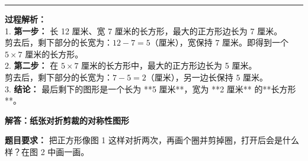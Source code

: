 \vspace{1.0cm}
\hrule
\vspace{0.4cm}

{\small
\textbf{过程解析：} \\
1. \textbf{第一步：} 长 12 厘米、宽 7 厘米的长方形，最大的正方形边长为 7 厘米。 \\
   剪去后，剩下部分的长宽为：$12 - 7 = 5$（厘米），宽保持 $7$ 厘米。即得到一个 $5 \times 7$ 厘米的长方形。 \\
2. \textbf{第二步：} 在 $5 \times 7$ 厘米的长方形中，最大的正方形边长为 5 厘米。 \\
   剪去后，剩下部分的长宽为：$7 - 5 = 2$（厘米），另一边长保持 $5$ 厘米。 \\
3. \textbf{结论：} 最后剩下的图形是一个长为 **5 厘米**，宽为 **2 厘米** 的**长方形**。
}




\newpage

\begin{center}
  {\large\bfseries 解答：纸张对折剪裁的对称性图形}
\end{center}

\vspace{0.6cm}

\noindent
{\small \textbf{题目要求：} 把正方形像图 1 这样对折两次，再画个圈并剪掉圈，打开后会是什么样？在图 2 中画一画。}

\vspace{1.0cm}

